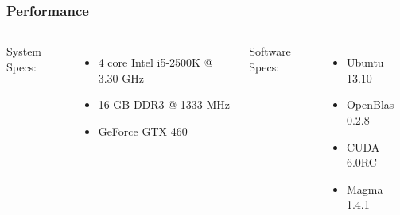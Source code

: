 \documentclass[t]{beamer}\usepackage[]{graphicx}\usepackage[]{color}
\begin{document}

\appendix


\begin{frame}
    


\end{frame}



\begin{frame}
\frametitle{Performance}

\vfill

\begin{columns}[t]
System Specs:
\vspace{2.5mm}
\begin{itemize}
\item 4 core Intel i5-2500K @ 3.30 GHz
\vspace{2mm} \item 16 GB DDR3 @ 1333 MHz
\vspace{2mm} \item GeForce GTX 460
\end{itemize}

Software Specs:
\vspace{0.5mm}
\begin{itemize}
\item Ubuntu 13.10
\vspace{2mm} \item OpenBlas 0.2.8
\vspace{2mm} \item CUDA 6.0RC
\vspace{2mm} \item Magma 1.4.1
\end{itemize}
\end{columns}

\vfill

\end{frame}

\end{document}
